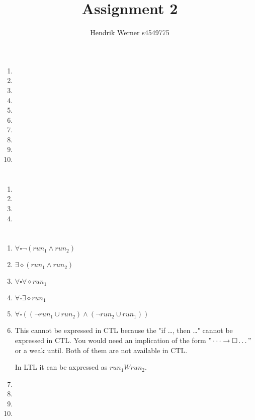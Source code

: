 \documentclass[12pt, a4paper]{article}
\title{Assignment 2}
\author{Hendrik Werner s4549775}
\begin{document}
\maketitle

\section{} %
\begin{enumerate}[a]
	\item %
	\item %
	\item %
	\item %
	\item %
	\item %
	\item %
	\item %
	\item %
	\item %
\end{enumerate}

\section{} %
\begin{enumerate}[a]
	\item %
	\item %
	\item %
	\item %
\end{enumerate}

\section{} %
\begin{enumerate}[a]
	\item %
	$\forall \square \lnot (run_1 \land run_2)$
	\item %
	$\exists \diamond (run_1 \land run_2)$
	\item %
	$\forall \square \forall \diamond run_1$
	\item %
	$\forall \square \exists \diamond run_1$
	\item %
	$\forall \square ((\lnot run_1 \cup run_2) \land (\lnot run_2 \cup run_1))$
	\item %
	This cannot be expressed in CTL because the "if \dots, then \dots" cannot be expressed in CTL. You would need an implication of the form $"\dots \rightarrow \square \dots"$ or a weak until. Both of them are not available in CTL.

	In LTL it can be axpressed as $run_1 W run_2$.
	\item %
	\item %
	\item %
	\item %
\end{enumerate}
\end{document}
